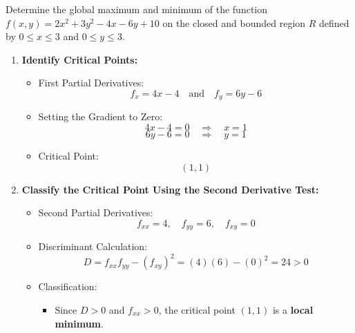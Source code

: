 \exampleline
\begin{example} Determine the global maximum and minimum of the function \( f(x,y) = 2x^2 + 3y^2 - 4x - 6y + 10 \) on the closed and bounded region \( R \) defined by \( 0 \leq x \leq 3 \) and \( 0 \leq y \leq 3 \).
    
    \begin{solution}
        \begin{enumerate}
            \item \textbf{Identify Critical Points:}
            
            \begin{itemize}
                \item First Partial Derivatives:
                \[
                f_x = 4x - 4 \quad \text{and} \quad f_y = 6y - 6
                \]
                
                \item Setting the Gradient to Zero: 
                \[
                4x - 4 = 0 \quad \Rightarrow \quad x = 1
                \]
                \[
                6y - 6 = 0 \quad \Rightarrow \quad y = 1
                \]
                
                \item Critical Point:
                \[
                (1, 1)
                \]
            \end{itemize}
            
            \item \textbf{Classify the Critical Point Using the Second Derivative Test:}
            
            \begin{itemize}
                \item Second Partial Derivatives:
                \[
                f_{xx} = 4, \quad f_{yy} = 6, \quad f_{xy} = 0
                \]
                
                \item Discriminant Calculation:
                \[
                D = f_{xx}f_{yy} - (f_{xy})^2 = (4)(6) - (0)^2 = 24 > 0
                \]
                
                \item Classification:
                \begin{itemize}
                    \item Since \( D > 0 \) and \( f_{xx} > 0 \), the critical point \( (1, 1) \) is a \textbf{local minimum}.
                \end{itemize}
            \end{itemize}
            

\end{enumerate}
\end{solution}
\end{example}

